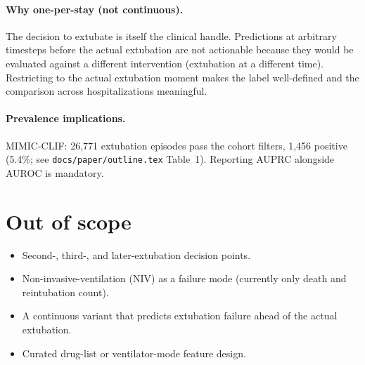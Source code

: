 \documentclass[11pt]{article}
\begin{document}
\paragraph{Why one-per-stay (not continuous).}
The decision to extubate is itself the clinical handle. Predictions at
arbitrary timesteps before the actual extubation are not actionable
because they would be evaluated against a different intervention
(extubation at a different time). Restricting to the actual
extubation moment makes the label well-defined and the comparison
across hospitalizations meaningful.

\paragraph{Prevalence implications.}
MIMIC-CLIF: 26{,}771 extubation episodes pass the cohort filters,
1{,}456 positive (5.4\%; see \texttt{docs/paper/outline.tex} Table~1).
Reporting AUPRC alongside AUROC is mandatory.

\section{Out of scope}

\begin{itemize}[leftmargin=2em]
  \item Second-, third-, and later-extubation decision points.
  \item Non-invasive-ventilation (NIV) as a failure mode (currently
        only death and reintubation count).
  \item A continuous variant that predicts extubation failure ahead of
        the actual extubation.
  \item Curated drug-list or ventilator-mode feature design.
\end{itemize}



\end{document}
